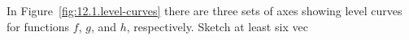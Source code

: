 \begin{activity} \label{A:12.1.2}  
\ba
\item In Figure~\ref{fig:12.1.level-curves} there are three sets of axes showing level
  curves for functions $f$, $g$, and $h$, respectively. Sketch at least six vec
\end{activity}
